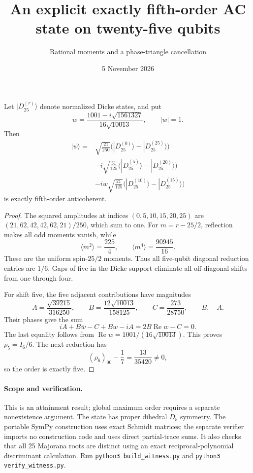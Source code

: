 \documentclass[11pt]{article}
\begin{document}
\title{An explicit exactly fifth-order AC state on twenty-five qubits}
\author{Rational moments and a phase-triangle cancellation}\date{5 November 2026}\maketitle
\begin{theorem}
Let $|D_{25}^{(r)}\rangle$ denote normalized Dicke states, and put
\[
 w=\frac{1001-i\sqrt{1561327}}{16\sqrt{10013}},\qquad |w|=1.
\]
Then
\[
\begin{aligned}
|\psi\rangle={}&\sqrt{\frac{21}{250}}\bigl(|D_{25}^{(0)}\rangle-|D_{25}^{(25)}\rangle\bigr)\\
&-i\sqrt{\frac{31}{125}}\bigl(|D_{25}^{(5)}\rangle-|D_{25}^{(20)}\rangle\bigr)\\
&-iw\sqrt{\frac{21}{125}}\bigl(|D_{25}^{(10)}\rangle-|D_{25}^{(15)}\rangle\bigr)
\end{aligned}
\]
is exactly fifth-order anticoherent.
\end{theorem}
\begin{proof}
The squared amplitudes at indices $(0,5,10,15,20,25)$ are
$(21,62,42,42,62,21)/250$, which sum to one.
For $m=r-25/2$, reflection makes all odd moments vanish, while
\[
\langle m^2\rangle=\frac{225}{4},\qquad
\langle m^4\rangle=\frac{90945}{16}.
\]
These are the uniform spin-$25/2$ moments. Thus all five-qubit diagonal
reduction entries are $1/6$. Gaps of five in the Dicke support eliminate
all off-diagonal shifts from one through four.

For shift five, the five adjacent contributions have magnitudes
\[
 A=\frac{\sqrt{39215}}{316250},\qquad
 B=\frac{12\sqrt{10013}}{158125},\qquad
 C=\frac{273}{28750},\qquad B,\quad A.
\]
Their phases give the sum
\[
 iA+B\overline w-C+Bw-iA=2B\operatorname{Re}w-C=0.
\]
The last equality follows from $\operatorname{Re}w=1001/(16\sqrt{10013})$.
This proves $\rho_5=I_6/6$.
The next reduction has
\[
 (\rho_6)_{00}-\frac17=\frac{13}{35420}\ne0,
\]
so the order is exactly five.
\end{proof}
\paragraph{Scope and verification.}
This is an attainment result; global maximum order requires a separate
nonexistence argument. The state has proper dihedral $D_5$ symmetry.
The portable SymPy construction uses exact Schmidt matrices; the separate
verifier imports no construction code and uses direct partial-trace sums.
It also checks that all 25 Majorana roots are distinct using an exact
reciprocal-polynomial discriminant calculation. Run \texttt{python3 build\_witness.py} and
\texttt{python3 verify\_witness.py}.
\end{document}
